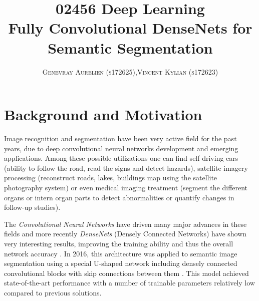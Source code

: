 \documentclass[a4,12pt]{article}
\title{\textbf{02456 Deep Learning\\Fully Convolutional DenseNets for Semantic Segmentation}}
\author{
	\begin{tabular}{cc}
		\textsc{Genevray Aurelien (s172625)}, & \textsc{Vincent Kylian (s172623)} \\
	\end{tabular}}
\date{}
\begin{document}
	\maketitle
	\vspace{-5em}
	\section{Background and Motivation}
	
	Image recognition and segmentation have been very active field for the past years, due to deep convolutional neural networks development and emerging applications. Among these possible utilizations one can find self driving cars (ability to follow the road, read the signs and detect hazards), satellite imagery processing (reconstruct roads, lakes, buildings map using the satellite photography system) or even medical imaging treatment (segment the different organs or intern organ parts to detect abnormalities or quantify changes in follow-up studies).
	
	The \textit{Convolutional Neural Networks} have driven many major advances in these fields and more recently \textit{DenseNets} (Densely Connected Networks) have shown very interesting results, improving the training ability and thus the overall network accuracy \cite{segmentation}. In 2016, this architecture was applied to semantic image segmentation using a special U-shaped network including densely connected convolutional blocks with skip connections between them \cite{tiramisu}. This model achieved state-of-the-art performance with a number of trainable parameters relatively low compared to previous solutions.
	
\end{document}
